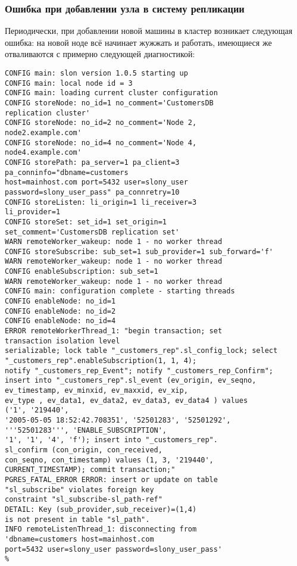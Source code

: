 \subsubsection{Ошибка при добавлении узла в систему репликации}
Периодически, при добавлении новой машины в кластер возникает следующая ошибка: на новой ноде всё начинает 
жужжать и работать, имеющиеся же отваливаются с примерно следующей диагностикой:
\begin{lstlisting}[label=lst:slony17,caption=Устранение неисправностей]
%slon customers_rep "dbname=customers user=slony_user"
CONFIG main: slon version 1.0.5 starting up
CONFIG main: local node id = 3
CONFIG main: loading current cluster configuration
CONFIG storeNode: no_id=1 no_comment='CustomersDB 
replication cluster'
CONFIG storeNode: no_id=2 no_comment='Node 2, 
node2.example.com'
CONFIG storeNode: no_id=4 no_comment='Node 4, 
node4.example.com'
CONFIG storePath: pa_server=1 pa_client=3 
pa_conninfo="dbname=customers 
host=mainhost.com port=5432 user=slony_user 
password=slony_user_pass" pa_connretry=10
CONFIG storeListen: li_origin=1 li_receiver=3 
li_provider=1
CONFIG storeSet: set_id=1 set_origin=1 
set_comment='CustomersDB replication set'
WARN remoteWorker_wakeup: node 1 - no worker thread
CONFIG storeSubscribe: sub_set=1 sub_provider=1 sub_forward='f'
WARN remoteWorker_wakeup: node 1 - no worker thread
CONFIG enableSubscription: sub_set=1
WARN remoteWorker_wakeup: node 1 - no worker thread
CONFIG main: configuration complete - starting threads
CONFIG enableNode: no_id=1
CONFIG enableNode: no_id=2
CONFIG enableNode: no_id=4
ERROR remoteWorkerThread_1: "begin transaction; set 
transaction isolation level 
serializable; lock table "_customers_rep".sl_config_lock; select 
"_customers_rep".enableSubscription(1, 1, 4); 
notify "_customers_rep_Event"; notify "_customers_rep_Confirm"; 
insert into "_customers_rep".sl_event (ev_origin, ev_seqno, 
ev_timestamp, ev_minxid, ev_maxxid, ev_xip, 
ev_type , ev_data1, ev_data2, ev_data3, ev_data4 ) values 
('1', '219440', 
'2005-05-05 18:52:42.708351', '52501283', '52501292', 
'''52501283''', 'ENABLE_SUBSCRIPTION', 
'1', '1', '4', 'f'); insert into "_customers_rep".
sl_confirm (con_origin, con_received, 
con_seqno, con_timestamp) values (1, 3, '219440', 
CURRENT_TIMESTAMP); commit transaction;" 
PGRES_FATAL_ERROR ERROR: insert or update on table 
"sl_subscribe" violates foreign key 
constraint "sl_subscribe-sl_path-ref"
DETAIL: Key (sub_provider,sub_receiver)=(1,4) 
is not present in table "sl_path".
INFO remoteListenThread_1: disconnecting from 
'dbname=customers host=mainhost.com 
port=5432 user=slony_user password=slony_user_pass'
%
\end{lstlisting}


